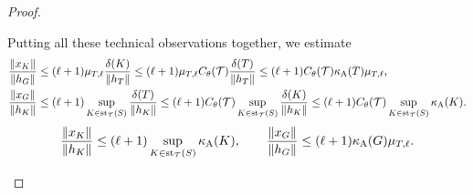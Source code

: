 \documentclass[10pt,a4paper]{article}
\begin{document}
\begin{proof}
\begin{itemize}
        Putting all these technical observations together, we estimate 
        \begin{align*}
            \frac{ \vecnorm{ x_{K} } }{ \vecnorm{ h_{{G}} } }
            &\leq 
            (\ell+1)\mu_{T,\ell}
            \frac{ \diam(K) }{ \vecnorm{ h_{T} } }
            \leq 
            (\ell+1)\mu_{T,\ell}
            \diameterratio(\calT)
            \frac{ \diam(T) }{ \vecnorm{ h_{T} } }
            \leq 
            (\ell+1)
            \diameterratio(\calT)
            \aspectratio(T) %
            \mu_{T,\ell}
            ,
            \\
            \frac{ \vecnorm{ x_{G} } }{ \vecnorm{ h_{K} } }
            &\leq 
            (\ell+1)
            \sup_{ K \in \patch_{\calT}(S) }
            \frac{ \diam(T) }{ \vecnorm{ h_{K} } }
            \leq 
            (\ell+1)
            \diameterratio(\calT)
            \sup_{ K \in \patch_{\calT}(S) }
            \frac{ \diam(K) }{ \vecnorm{ h_{K} } }
            \leq 
            (\ell+1)
            \diameterratio(\calT)
            \sup_{ K \in \patch_{\calT}(S) }
            \aspectratio(K) %
            .
        \end{align*}
        \begin{gather*}
            \frac{ \vecnorm{ x_{K} } }{ \vecnorm{ h_{{K}} } }
            \leq 
            (\ell+1)
            \sup_{ K \in \patch_{\calT}(S) }
            \aspectratio(K) %
            ,
            \qquad 
            \frac{ \vecnorm{ x_{G} } }{ \vecnorm{ h_{G} } }
            \leq 
            (\ell+1)
            \aspectratio({G}) \mu_{T,\ell} %
            .
        \end{gather*}

        
        

\end{itemize}
\end{proof}
\end{document}
